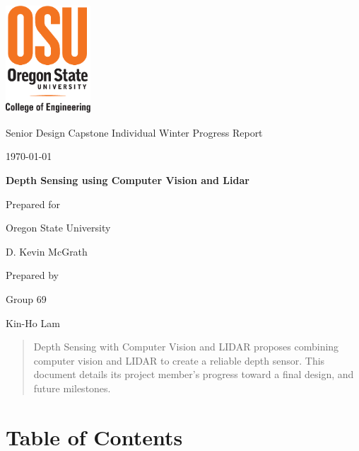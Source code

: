 \documentclass[onecolumn, draftclsnofoot,10pt, compsoc]{IEEEtran}
\def \CapstoneTeamName{			}
\def \CapstoneTeamNumber{		69}
\def \GroupMemberOne{			Kin-Ho Lam}
\def \CapstoneProjectName{		Depth Sensing using Computer Vision and Lidar}
\def \CapstoneSponsorCompany{	Oregon State University}
\def \CapstoneSponsorPerson{	D. Kevin McGrath}
\def \DocType{
	Individual Winter Progress Report
}
\newcommand{\NameSigPair}[1]{\par
	\makebox[2.75in][r]{#1} \hfil 	\makebox[3.25in]{\makebox[2.25in]{\hrulefill} \hfill		\makebox[.75in]{\hrulefill}}
	\par\vspace{-12pt} \textit{\tiny\noindent
		\makebox[2.75in]{} \hfil		\makebox[3.25in]{\makebox[2.25in][r]{Signature} \hfill	\makebox[.75in][r]{Date}}}}
\renewcommand{\NameSigPair}[1]{#1}
\begin{document}
	\begin{titlepage}
		\begin{singlespace}
			\centering
			\includegraphics[height=4cm,natwidth=345,natheight=435]{images/osu_logo.png}
			\hfill 
			\par\vspace{.2in}
			\centering
			\scshape{
				\huge Senior Design Capstone \DocType \par
				{\large\today}\par
				\vspace{.5in}
				\textbf{\Huge\CapstoneProjectName}\par
				\vfill
				{\large Prepared for}\par
				\Huge \CapstoneSponsorCompany\par
				\vspace{5pt}
				{\Large\NameSigPair{\CapstoneSponsorPerson}\par}
				{\large Prepared by }\par
				Group\CapstoneTeamNumber\par
				\CapstoneTeamName\par 
				\vspace{5pt}
				{\large
					\NameSigPair{\GroupMemberOne}\par
				}
				\vspace{20pt}
			}
			\begin{abstract}  
 				Depth Sensing with Computer Vision and LIDAR proposes combining computer vision and LIDAR to create a reliable depth sensor.
				This document details its project member's progress toward a final design, and future milestones.
			\end{abstract}     
		\end{singlespace}
	\end{titlepage}
\section{Table of Contents}
\tableofcontents


\clearpage
\end{document}
